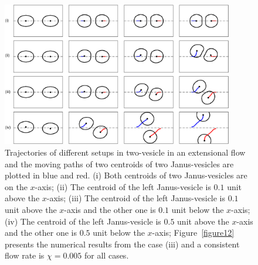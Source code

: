 \documentclass[lineno]{jfm}
\begin{document}
\begin{figure}
\begin{center}
\includegraphics[width=0.9\textwidth]{ExtTraj.eps}
\end{center} 
  \caption{\label{figure11} Trajectories of different setups in
  two-vesicle in an extensional flow and the moving paths of two
  centroids of two Janus-vesicles are plotted in blue and red. (i) Both
  centroids of two Janus-vesicles are on the $x$-axis; (ii) The centroid
  of the left Janus-vesicle is $0.1$ unit above the $x$-axis; (iii) The
  centroid of the left Janus-vesicle is $0.1$ unit above the $x$-axis
  and the other one is $0.1$ unit below the $x$-axis; (iv) The centroid
  of the left Janus-vesicle is $0.5$ unit above the $x$-axis and the
  other one is $0.5$ unit below the $x$-axis; Figure~\ref{figure12}
  presents the numerical results from the case (iii) and a consistent
  flow rate is $\chi = 0.005$ for all cases.}
\end{figure}
\end{document}
